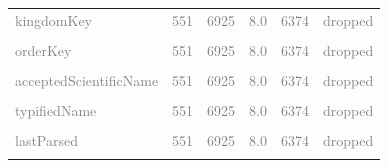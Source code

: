 \documentclass[sn-apa,pdflatex]{sn-jnl}
\begin{document}
\begin{longtable}[t]{lrrrrl}
\textcolor{gray}{kingdomKey} & \textcolor{gray}{551} & \textcolor{gray}{6925} & \textcolor{gray}{8.0} & \textcolor{gray}{6374} & \textcolor{gray}{dropped}\\
\addlinespace
\textcolor{gray}{\cellcolor{gray!10}{phylumKey}} & \textcolor{gray}{\cellcolor{gray!10}{551}} & \textcolor{gray}{\cellcolor{gray!10}{6925}} & \textcolor{gray}{\cellcolor{gray!10}{8.0}} & \textcolor{gray}{\cellcolor{gray!10}{6374}} & \textcolor{gray}{\cellcolor{gray!10}{dropped}}\\
\textcolor{gray}{orderKey} & \textcolor{gray}{551} & \textcolor{gray}{6925} & \textcolor{gray}{8.0} & \textcolor{gray}{6374} & \textcolor{gray}{dropped}\\
\textcolor{gray}{\cellcolor{gray!10}{familyKey}} & \textcolor{gray}{\cellcolor{gray!10}{551}} & \textcolor{gray}{\cellcolor{gray!10}{6925}} & \textcolor{gray}{\cellcolor{gray!10}{8.0}} & \textcolor{gray}{\cellcolor{gray!10}{6374}} & \textcolor{gray}{\cellcolor{gray!10}{dropped}}\\
\textcolor{gray}{acceptedScientificName} & \textcolor{gray}{551} & \textcolor{gray}{6925} & \textcolor{gray}{8.0} & \textcolor{gray}{6374} & \textcolor{gray}{dropped}\\
\textcolor{gray}{\cellcolor{gray!10}{verbatimScientificName}} & \textcolor{gray}{\cellcolor{gray!10}{551}} & \textcolor{gray}{\cellcolor{gray!10}{6925}} & \textcolor{gray}{\cellcolor{gray!10}{8.0}} & \textcolor{gray}{\cellcolor{gray!10}{6374}} & \textcolor{gray}{\cellcolor{gray!10}{dropped}}\\
\addlinespace
\textcolor{gray}{typifiedName} & \textcolor{gray}{551} & \textcolor{gray}{6925} & \textcolor{gray}{8.0} & \textcolor{gray}{6374} & \textcolor{gray}{dropped}\\
\textcolor{gray}{\cellcolor{gray!10}{protocol}} & \textcolor{gray}{\cellcolor{gray!10}{551}} & \textcolor{gray}{\cellcolor{gray!10}{6925}} & \textcolor{gray}{\cellcolor{gray!10}{8.0}} & \textcolor{gray}{\cellcolor{gray!10}{6374}} & \textcolor{gray}{\cellcolor{gray!10}{dropped}}\\
\textcolor{gray}{lastParsed} & \textcolor{gray}{551} & \textcolor{gray}{6925} & \textcolor{gray}{8.0} & \textcolor{gray}{6374} & \textcolor{gray}{dropped}\\
\textcolor{gray}{\cellcolor{gray!10}{lastCrawled}} & \textcolor{gray}{\cellcolor{gray!10}{551}} & \textcolor{gray}{\cellcolor{gray!10}{6925}} & \textcolor{gray}{\cellcolor{gray!10}{8.0}} & \textcolor{gray}{\cellcolor{gray!10}{6374}} & \textcolor{gray}{\cellcolor{gray!10}{dropped}}\\

\end{longtable}
\end{document}
